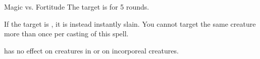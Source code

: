 \begin{spellheader}
\end{spellheader}
\begin{spellcontent}
    \begin{spelltargetinginfo}
    \end{spelltargetinginfo}
    \begin{spelleffects}
        \begin{spellattack}{Magic vs. Fortitude}
            \spellsuccess The target is \staggered for 5 rounds.

            If the target is \bloodied, it is instead instantly slain.
            \spellspecial You cannot target the same creature more than once per casting of this spell.
        \end{spellattack}
    \end{spelleffects}
\end{spellcontent}
\begin{spellfooter}
    \spellnotes {} has no effect on creatures in  or on incorporeal creatures.
\end{spellfooter}

